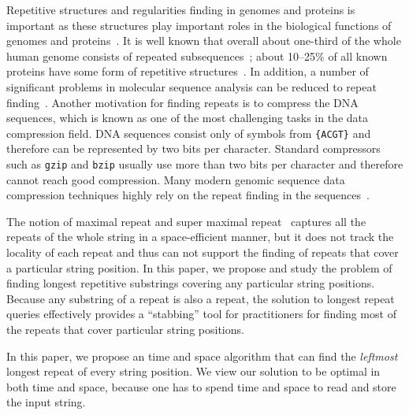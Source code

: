 \documentclass[preprint]{elsarticle}
\newcommand{\remove}[1]{}
\begin{document}
Repetitive structures and regularities finding in genomes and proteins
is important as these structures play important roles in the 
biological functions of genomes and proteins~\cite{Gus97}.  It is
well known that overall about one-third of the whole human genome
consists of repeated subsequences~\cite{McC1993}; about 10--25\% of
all known proteins have some form of repetitive
structures~\cite{LW06}. In addition, a number of significant problems
in molecular sequence analysis can be reduced to repeat
finding~\cite{Mar83}. Another motivation for finding repeats is to
compress the DNA sequences, which is known as one of the most
challenging tasks in the data compression field. DNA sequences consist
only of symbols from {\tt \{ACGT\}} and therefore can be represented
by two bits per character. Standard compressors such as {\tt gzip} and
{\tt bzip} usually use more than two bits per character and therefore
cannot reach good compression. Many modern genomic sequence data
compression techniques highly rely on the repeat finding in the
sequences~\cite{MR04,BF05}.







The notion of maximal repeat and super maximal
repeat~\cite{Gus97,KVX-BIBM2010,KVX-tcbb2012,BBO-spire2012} captures
all the repeats of the whole string in a space-efficient manner, but
it does not track the locality of each repeat and thus can not support
the finding of repeats that cover a particular string position.
In this paper, we propose and study the problem of finding longest
repetitive substrings covering any particular string positions.
Because any substring of a repeat is also a repeat, the solution to
longest repeat queries effectively provides a ``stabbing'' tool for
practitioners for finding most of the repeats that cover particular
string positions.
\remove{
The recent study of finding shortest unique substrings (SUS) covering
particular string positions~\cite{PWY-ICDE2013,
TIBT2014,IKX-CPM2014} may help find some repeats
covering particular string positions, because any extension of a SUS
must be a repeat.  However, such trivial reduction does not guarantee
the finding of the longest repeat that covers an arbitrary string
position. In fact, it is not yet well understood how to reduce longest
repeat finding to SUS finding.
}

In this paper, we propose an  time and space algorithm that can
find the \emph{leftmost} longest repeat of every string
position. We view our solution to be optimal in both time and space, 
because one has to spend  time and space to read
and store the input string.
\end{document}

